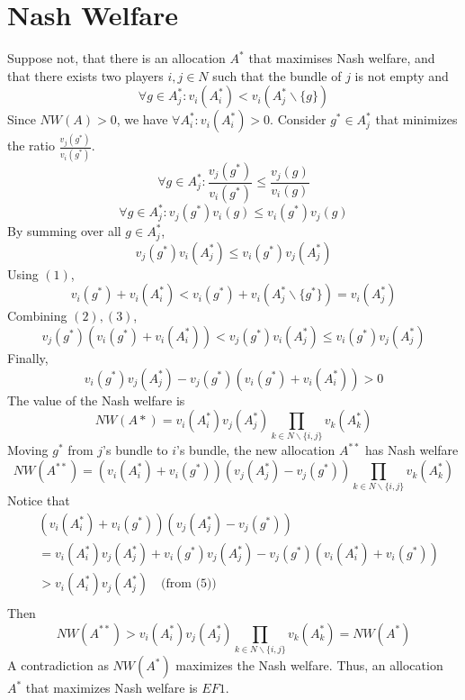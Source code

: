




\section{Nash Welfare}
Suppose not, that there is an allocation $A^*$ that maximises
Nash welfare, and that there exists two players $i,j\in N$ such that
the bundle of $j$ is not empty and 
\begin{equation}
    \forall g\in A_j^* : v_i(A_i^*) < v_i(A_j^*\backslash\{g\})
\end{equation}
Since $NW(A)>0$, we have $\forall A_i^*: v_i(A_i^*)>0$.
Consider $g^*\in A_j^*$ that minimizes the ratio $\frac{v_j(g^*)}{v_i(g^*)}$.
\[\forall g\in A_j^* : 
\frac{v_j(g^*)}{v_i(g^*)} \leq \frac{v_j(g)}{v_i(g)}\]
\[\forall g\in A_j^* : v_j(g^*)v_i(g) \leq v_i(g^*)v_j(g)\]
By summing over all $g\in A_j^*$,
\begin{equation}
    v_j(g^*)v_i(A_j^*) \leq v_i(g^*)v_j(A_j^*)
\end{equation}
Using $(1)$,
\begin{equation}
    v_i(g^*) + v_i(A_i^*) < v_i(g^*) + v_i(A_j^*\backslash\{g^*\})  
    = v_i(A_j^*)
\end{equation}
Combining $(2),(3)$,
\begin{equation}
    v_j(g^*)(v_i(g^*) + v_i(A_i^*))
    <v_j(g^*)v_i(A_j^*)\leq v_i(g^*)v_j(A_j^*)
\end{equation}
Finally,
\begin{equation}
    v_i(g^*)v_j(A_j^*) - v_j(g^*)(v_i(g^*) + v_i(A_i^*)) > 0
\end{equation}
The value of the Nash welfare is
\[NW(A*)=v_i(A_i^*)v_j(A_j^*)\prod_{k\in N\backslash\{i,j\}}v_k(A_k^*)\]
Moving $g^*$ from $j$'s bundle to $i$'s bundle, the new allocation
$A^{**}$ has Nash welfare
\[NW(A^{**})=(v_i(A_i^*)+v_i(g^*))(v_j(A_j^*)-v_j(g^*))
\prod_{k\in N\backslash\{i,j\}}v_k(A_k^*)\]
Notice that
\begin{equation}
\begin{aligned}
    &(v_i(A_i^*)+v_i(g^*))(v_j(A_j^*)-v_j(g^*))\\
    &=v_i(A_i^*)v_j(A_j^*)+v_i(g^*)v_j(A_j^*)
    -v_j(g^*)(v_i(A_i^*)+v_i(g^*))\\
    &> v_i(A_i^*)v_j(A_j^*) \quad\text{(from (5))}\\
\end{aligned}
\end{equation}
Then
\[NW(A^{**})>v_i(A_i^*)v_j(A_j^*)\prod_{k\in N\backslash\{i,j\}}v_k(A_k^*)
=NW(A^*)\]
A contradiction as $NW(A^*)$ maximizes the Nash welfare.
Thus, an allocation $A^*$ that maximizes Nash welfare is $EF1$.

